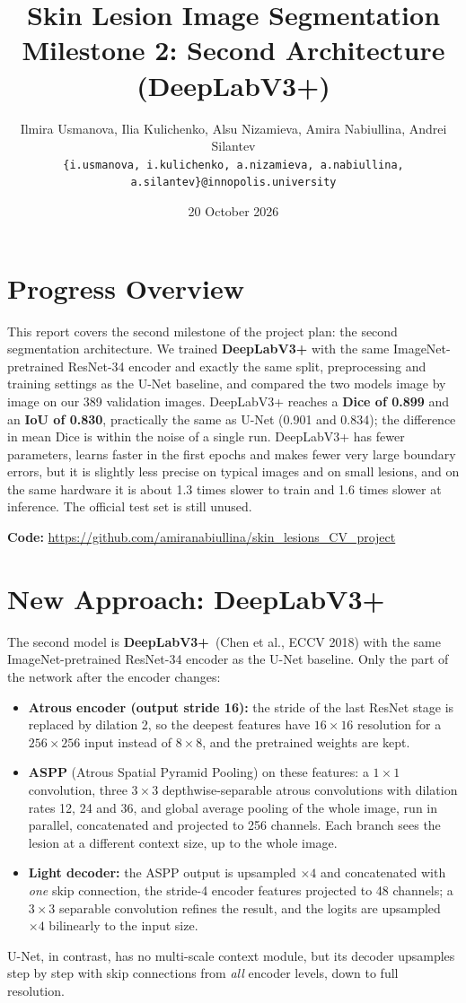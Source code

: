 \documentclass[11pt,a4paper]{article}
\title{\textbf{Skin Lesion Image Segmentation}\\ \large Milestone 2: Second Architecture (DeepLabV3+)}
\author{Ilmira Usmanova, Ilia Kulichenko, Alsu Nizamieva, Amira Nabiullina, Andrei Silantev\\
{\small\texttt{\{i.usmanova, i.kulichenko, a.nizamieva, a.nabiullina, a.silantev\}@innopolis.university}}}
\date{20 October 2026}
\begin{document}
\maketitle

\section{Progress Overview}

This report covers the second milestone of the project plan: the second segmentation architecture.
We trained \textbf{DeepLabV3+} with the same ImageNet-pretrained ResNet-34 encoder and exactly the
same split, preprocessing and training settings as the U-Net baseline, and compared the two models
image by image on our 389 validation images. DeepLabV3+ reaches a \textbf{Dice of 0.899} and an
\textbf{IoU of 0.830}, practically the same as U-Net (0.901 and 0.834); the difference in mean Dice
is within the noise of a single run. DeepLabV3+ has fewer parameters, learns faster in the first
epochs and makes fewer very large boundary errors, but it is slightly less precise on typical images
and on small lesions, and on the same hardware it is about 1.3 times slower to train and 1.6 times
slower at inference. The official test set is still unused.

\textbf{Code:} \url{https://github.com/amiranabiullina/skin_lesions_CV_project}

\section{New Approach: DeepLabV3+}

The second model is \textbf{DeepLabV3+}~(Chen et al., ECCV 2018) with the same
ImageNet-pretrained ResNet-34 encoder as the U-Net baseline. Only the part of the network after the
encoder changes:
\begin{itemize}[noitemsep]
\item \textbf{Atrous encoder (output stride 16):} the stride of the last ResNet stage is
replaced by dilation 2, so the deepest features have $16\times16$ resolution for a
$256\times256$ input instead of $8\times8$, and the pretrained weights are kept.
\item \textbf{ASPP} (Atrous Spatial Pyramid Pooling) on these features: a $1\times1$
convolution, three $3\times3$ depthwise-separable atrous convolutions with dilation
rates 12, 24 and 36, and global average pooling of the whole image, run in parallel,
concatenated and projected to 256 channels. Each branch sees the lesion at a different
context size, up to the whole image.
\item \textbf{Light decoder:} the ASPP output is upsampled $\times4$ and concatenated with
\emph{one} skip connection, the stride-4 encoder features projected to 48 channels;
a $3\times3$ separable convolution refines the result, and the logits are upsampled
$\times4$ bilinearly to the input size.
\end{itemize}
U-Net, in contrast, has no multi-scale context module, but its decoder upsamples step by step
with skip connections from \emph{all} encoder levels, down to full resolution.
\end{document}
